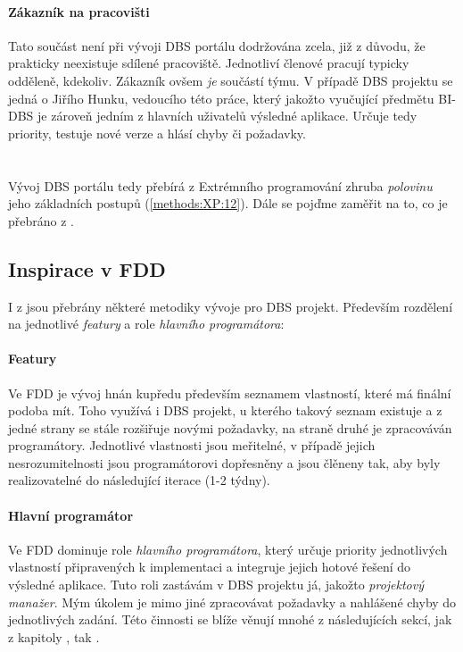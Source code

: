 \paragraph{Zákazník na pracovišti}
Tato součást není při vývoji DBS portálu dodržována zcela, již z důvodu, že prakticky neexistuje sdílené pracoviště. Jednotliví členové pracují typicky odděleně, kdekoliv.
Zákazník ovšem \emph{je} součástí týmu. V případě DBS projektu se jedná o Jiřího Hunku, vedoucího této práce, který jakožto vyučující předmětu BI-DBS je zároveň jedním z hlavních uživatelů výsledné aplikace. Určuje tedy priority, testuje nové verze a hlásí chyby či požadavky.
\\
\\
\\
Vývoj DBS portálu tedy přebírá z Extrémního programování zhruba \emph{polovinu} jeho základních postupů (\ref{methods:XP:12}). Dále se pojďme zaměřit na to, co je přebráno z .


\subsection{Inspirace v FDD}

I z  jsou přebrány některé metodiky vývoje pro DBS projekt. Především rozdělení na jednotlivé \emph{featury} a role \emph{hlavního programátora}:

\paragraph{Featury} Ve FDD je vývoj hnán kupředu především seznamem vlastností, které má finální podoba mít. Toho využívá i DBS projekt, u kterého takový seznam existuje a z jedné strany se stále rozšiřuje novými požadavky, na straně druhé je zpracováván programátory. Jednotlivé vlastnosti jsou meřitelné, v případě jejich nesrozumitelnosti jsou programátorovi dopřesněny a jsou člěneny tak, aby byly realizovatelné do následující iterace (1-2 týdny).

\paragraph{Hlavní programátor}
Ve FDD dominuje role \emph{hlavního programátora}, který určuje priority jednotlivých vlastností připravených k implementaci a integruje jejich hotové řešení do výsledné aplikace. Tuto roli zastávám v DBS projektu já, jakožto \emph{projektový manažer}. Mým úkolem je mimo jiné zpracovávat požadavky a nahlášené chyby do jednotlivých zadání. Této činnosti se blíže věnují mnohé z následujících sekcí, jak z kapitoly , tak .
